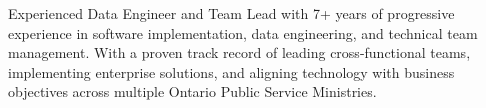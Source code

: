 
\begin{cvparagraph}

Experienced Data Engineer and Team Lead with 7+ years of progressive experience in software implementation, data engineering, and technical team management. With a proven track record of leading cross-functional teams, implementing enterprise solutions, and aligning technology with business objectives across multiple Ontario Public Service Ministries.
\end{cvparagraph}

